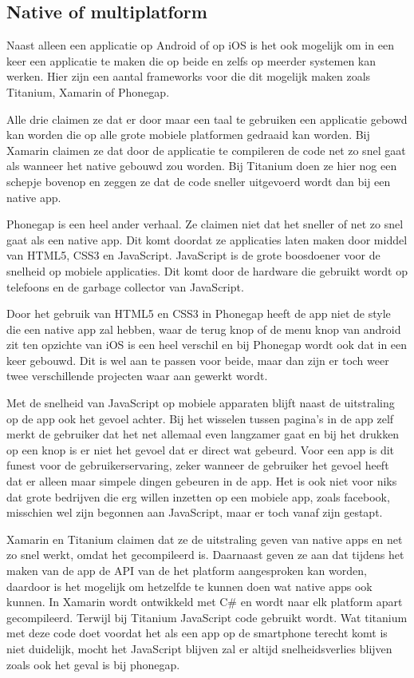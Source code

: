 \documentclass[a4paper,11pt,oneside]{report}
\begin{document}
\subsection{Native of multiplatform}
Naast alleen een applicatie op Android of op iOS is het ook mogelijk om in een keer een applicatie te maken die op beide en zelfs op meerder systemen kan werken. Hier zijn een aantal frameworks voor die dit mogelijk maken zoals Titanium, Xamarin of Phonegap. 

Alle drie claimen ze dat er door maar een taal te gebruiken een applicatie gebowd kan worden die op alle grote mobiele platformen gedraaid kan worden. Bij Xamarin claimen ze dat door de applicatie te compileren de code net zo snel gaat als wanneer het native gebouwd zou worden. Bij Titanium doen ze hier nog een schepje bovenop en zeggen ze dat de code sneller uitgevoerd wordt dan bij een native app.

\label{phonegap} Phonegap is een heel ander verhaal. Ze claimen niet dat het sneller of net zo snel gaat als een native app. Dit komt doordat ze applicaties laten maken door middel van HTML5, CSS3 en JavaScript. JavaScript is de grote boosdoener voor de snelheid op mobiele applicaties. Dit komt door de hardware die gebruikt wordt op telefoons en de garbage collector van JavaScript.

Door het gebruik van HTML5 en CSS3 in Phonegap heeft de app niet de style die een native app zal hebben, waar de terug knop of de menu knop van android zit ten opzichte van iOS is een heel verschil en bij Phonegap wordt ook dat in een keer gebouwd. Dit is wel aan te passen voor beide, maar dan zijn er toch weer twee verschillende projecten waar aan gewerkt wordt. 

Met de snelheid van JavaScript op mobiele apparaten blijft naast de uitstraling op de app ook het gevoel achter. Bij het wisselen tussen pagina's in de app zelf merkt de gebruiker dat het net allemaal even langzamer gaat en bij het drukken op een knop is er niet het gevoel dat er direct wat gebeurd. Voor een app is dit funest voor de gebruikerservaring, zeker wanneer de gebruiker het gevoel heeft dat er alleen maar simpele dingen gebeuren in de app. Het is ook niet voor niks dat grote bedrijven die erg willen inzetten op een mobiele app, zoals facebook, misschien wel zijn begonnen aan JavaScript, maar er toch vanaf zijn gestapt.

Xamarin en Titanium claimen dat ze de uitstraling geven van native apps en net zo snel werkt, omdat het gecompileerd is. Daarnaast geven ze aan dat tijdens het maken van de app de API van de het platform aangesproken kan worden, daardoor is het mogelijk om hetzelfde te kunnen doen wat native apps ook kunnen. In Xamarin wordt ontwikkeld met C\# en wordt naar elk platform apart gecompileerd. Terwijl bij Titanium JavaScript code gebruikt wordt. Wat titanium met deze code doet voordat het als een app op de smartphone terecht komt is niet duidelijk, mocht het JavaScript blijven zal er altijd snelheidsverlies blijven zoals ook het geval is bij phonegap.
\end{document}
